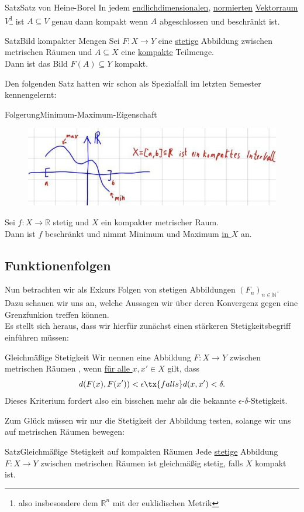 \begin{Satz}
{Satz}{Satz von Heine-Borel}
In jedem \underline{endlichdimensionalen}, \underline{normierten} \underline{Vektorraum} $V$\footnote{also insbesondere dem $\mathbb{R}^n$ mit der euklidischen Metrik} ist $A\subseteq V$ genau dann kompakt wenn $A$ abgeschlossen und beschränkt ist.\\
\end{Satz}
\begin{Satz}
{Satz}{Bild kompakter Mengen}
Sei $F:X\to Y$ eine \underline{stetige} Abbildung zwischen metrischen Räumen und $A\subseteq X$ eine \underline{kompakte} Teilmenge.\\
Dann ist das Bild $F(A)\subseteq Y$ kompakt.
\end{Satz}
Den folgenden Satz hatten wir schon als Spezialfall im letzten Semester kennengelernt:
\begin{Satz}
{Folgerung}{Minimum-Maximum-Eigenschaft}
\begin{figure}
 \vspace{-15pt}
\includegraphics[width=.35\textwidth]{Dateien/06/06MinMax.jpg}
 \vspace{-15pt}
\end{figure}
Sei $f:X\to \mathbb{R}$ stetig und $X$ ein kompakter metrischer Raum.\\
Dann ist $f$ beschränkt und nimmt Minimum und Maximum \underline{in $X$} an.
\end{Satz}

\subsection{Funktionenfolgen}
Nun betrachten wir als Exkurs Folgen von stetigen Abbildungen $(F_n)_{n\in\mathbb{N}}$.\\
Dazu schauen wir uns an, welche Aussagen wir über deren Konvergenz gegen eine Grenzfunkion treffen können.\\
Es stellt sich heraus, dass wir hierfür zunächst einen stärkeren Stetigkeitsbegriff einführen müssen:
\begin{Def}
{Gleichmäßige Stetigkeit}
Wir nennen eine Abbildung $F:X\to Y$ zwischen metrischen Räumen , wenn \underline{für alle $x,x'\in X$} gilt, dass
\begin{equation*}
    d(F(x),F(x'))<\epsilon\tx{ falls } d(x,x')<\delta.
\end{equation*}
Dieses Kriterium fordert also ein bisschen mehr als die bekannte $\epsilon$-$\delta$-Stetigkeit.
\end{Def}
Zum Glück müssen wir nur die Stetigkeit der Abbildung testen, solange wir uns auf metrischen Räumen bewegen:
\begin{Satz}
{Satz}{Gleichmäßige Stetigkeit auf kompakten Räumen}
Jede \underline{stetige} Abbildung $F:X\to Y$ zwischen metrischen Räumen ist gleichmäßig stetig, falls $X$ kompakt ist.
\end{Satz}

